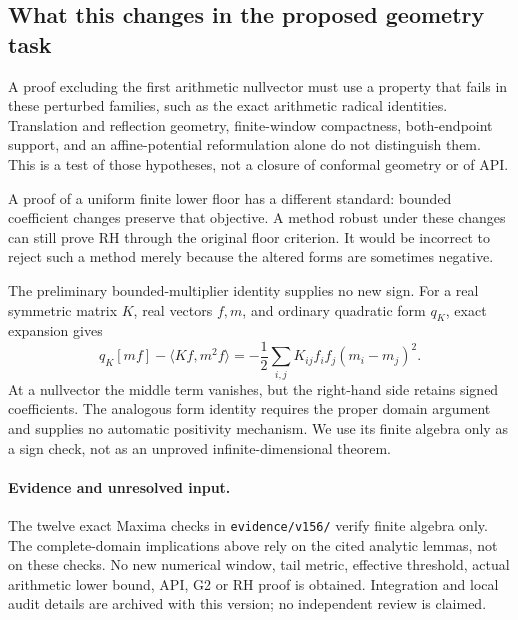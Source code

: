 \subsection*{What this changes in the proposed geometry task}
A proof excluding the first arithmetic nullvector must use a property
that fails in these perturbed families, such as the exact arithmetic
radical identities. Translation and reflection geometry, finite-window
compactness, both-endpoint support, and an affine-potential reformulation
alone do not distinguish them. This is a test of those hypotheses,
not a closure of conformal geometry or of API.

A proof of a uniform finite lower floor has a different standard:
bounded coefficient changes preserve that objective. A method robust
under these changes can still prove RH through the original floor
criterion. It would be incorrect to reject such a method merely
because the altered forms are sometimes negative.

The preliminary bounded-multiplier identity supplies no new sign.
For a real symmetric matrix $K$, real vectors $f,m$, and ordinary
quadratic form $q_K$, exact expansion gives
\[
 q_K[mf]-\langle Kf,m^2f\rangle
 =-\frac12\sum_{i,j}K_{ij}f_if_j(m_i-m_j)^2.
\]
At a nullvector the middle term vanishes, but the right-hand side
retains signed coefficients. The analogous form identity requires
the proper domain argument and supplies no automatic positivity
mechanism. We use its finite algebra only as a sign check, not as
an unproved infinite-dimensional theorem.


\paragraph{Evidence and unresolved input.}
The twelve exact Maxima checks in \texttt{evidence/v156/} verify finite
algebra only. The complete-domain implications above rely on the cited
analytic lemmas, not on these checks. No new numerical window, tail metric,
effective threshold, actual arithmetic lower bound, API, G2 or RH proof is
obtained. Integration and local audit details are archived with this version;
no independent review is claimed.
